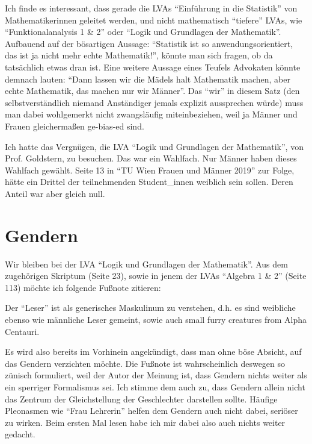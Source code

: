 \documentclass{article}
\begin{document}
Ich finde es interessant, dass gerade die LVAs \enquote{Einführung in die Statistik} von Mathematikerinnen geleitet werden, und nicht mathematisch \enquote{tiefere} LVAs, wie \enquote{Funktionalanalysis 1 \& 2} oder \enquote{Logik und Grundlagen der Mathematik}.
Aufbauend auf der bösartigen Aussage:
\enquote{Statistik ist so anwendungsorientiert, das ist ja nicht mehr echte Mathematik!},
könnte man sich fragen, ob da tatsächlich etwas dran ist.
Eine weitere Aussage eines Teufels Advokaten könnte demnach lauten:
\enquote{Dann lassen wir die Mädels halt Mathematik machen, aber echte Mathematik, das machen nur wir Männer}.
Das \enquote{wir} in diesem Satz (den selbstverständlich niemand Anständiger jemals explizit aussprechen würde) muss man dabei wohlgemerkt nicht zwangsläufig miteinbeziehen, weil ja Männer und Frauen gleichermaßen ge-bias-ed sind.

Ich hatte das Vergnügen, die LVA \enquote{Logik und Grundlagen der Mathematik}, von Prof. Goldstern, zu besuchen.
Das war ein Wahlfach.
Nur Männer haben dieses Wahlfach gewählt.
Seite 13 in \enquote{TU Wien Frauen und Männer 2019} zur Folge, hätte ein Drittel der teilnehmenden Student\_innen weiblich sein sollen.
Deren Anteil war aber gleich null.

\section*{Gendern}

Wir  bleiben bei der LVA \enquote{Logik und Grundlagen der Mathematik}.
Aus dem zugehörigen Skriptum (Seite 23), sowie in jenem der LVAs \enquote{Algebra 1 \& 2} (Seite 113) möchte ich folgende Fußnote zitieren:

\begin{displayquote}
	Der \enquote{Leser} ist als generisches Maskulinum zu verstehen, d.h. es sind weibliche ebenso wie männliche Leser gemeint, sowie auch small furry creatures from Alpha Centauri.
\end{displayquote}

Es wird also bereits im Vorhinein angekündigt, dass man ohne böse Absicht, auf das Gendern verzichten möchte.
Die Fußnote ist wahrscheinlich deswegen so zünisch formuliert, weil der Autor der Meinung ist, dass Gendern nichts weiter als ein sperriger Formalismus sei.
Ich stimme dem auch zu, dass Gendern allein nicht das Zentrum der Gleichstellung der Geschlechter darstellen sollte.
Häufige Pleonasmen wie \enquote{Frau Lehrerin} helfen dem Gendern auch nicht dabei, seriöser zu wirken.
Beim ersten Mal lesen habe ich mir dabei also auch nichts weiter gedacht.
\end{document}
